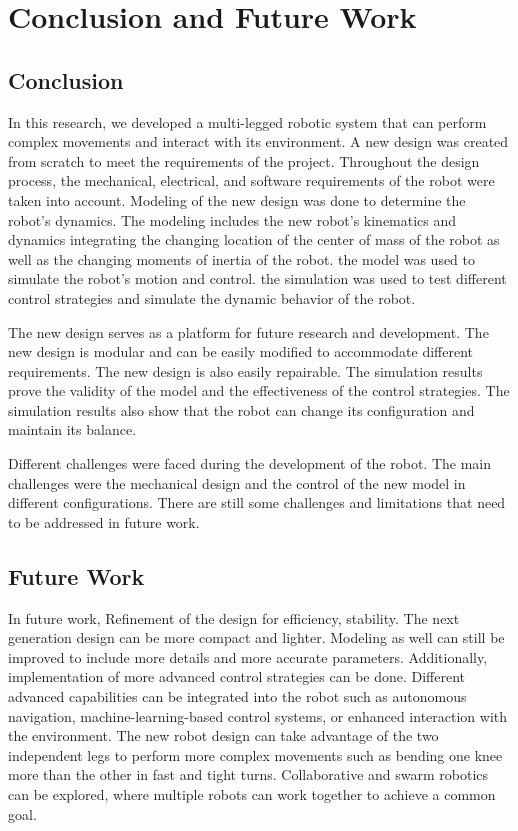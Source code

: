 \chapter{Conclusion and Future Work}

\graphicspath{{./Figures/Modeling}}

\section{Conclusion}
In this research, we developed a multi-legged robotic system that can perform complex movements and interact with its environment.
A new design was created from scratch to meet the requirements of the project.
Throughout the design process, the mechanical, electrical, and software requirements of the robot were taken into account.
Modeling of the new design was done to determine the robot's dynamics.
The modeling includes the new robot's kinematics and dynamics integrating the changing location of the center of mass of the robot as well as the changing  moments of inertia of the robot.
the model was used to simulate the robot's motion and control.
the simulation was used to test different control strategies and simulate the dynamic behavior of the robot.

The new design serves as a platform for future research and development.
The new design is modular and can be easily modified to accommodate different requirements.
The new design is also easily repairable.
The simulation results prove the validity of the model and the effectiveness of the control strategies.
The simulation results also show that the robot can change its configuration and maintain its balance.

Different challenges were faced during the development of the robot.
The main challenges were the mechanical design and the control of the new model in different configurations.
There are still some challenges and limitations that need to be addressed in future work.

\section{Future Work}
In future work, Refinement of the design for efficiency, stability.
The next generation design can be more compact and lighter.
Modeling as well can still be improved to include more details and more accurate parameters.
Additionally, implementation of more advanced control strategies can be done.
Different advanced capabilities can be integrated into the robot such as autonomous navigation, machine-learning-based control systems, or enhanced interaction with the environment.
The new robot design can take advantage of the two independent legs to perform more complex movements such as bending one knee more than the other in fast and tight turns.
Collaborative and swarm robotics can be explored, where multiple robots can work together to achieve a common goal.